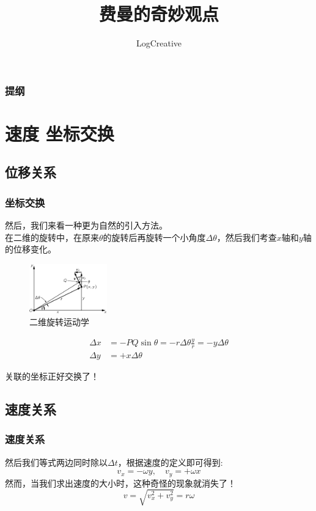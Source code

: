 %

    \title{费曼的奇妙观点}
    \author{LogCreative}

    \maketitle

    \begin{frame}
    \frametitle{提纲}
    \tableofcontents
    \end{frame}

\section{速度 坐标交换}
\subsection[位移关系]{位移关系}
    \begin{frame}
        \frametitle{坐标交换}
        然后，我们来看一种更为自然的引入方法。\\
        在二维的旋转中，在原来$\theta$的旋转后再旋转一个小角度$\Delta\theta$，然后我们考查$x$轴和$y$轴的位移变化。
    \begin{figure}
    \centering
    \includegraphics[width=0.3\textwidth]{pic1.png}
    \caption{二维旋转运动学}
    \end{figure}
    \begin{align}
    \Delta x&=-PQ \sin\theta=-r\Delta\theta \frac{y}{r}=-y\Delta\theta \\
    \Delta y&=+x\Delta\theta
    \end{align}

    关联的坐标正好交换了！
    \end{frame}

\subsection{速度关系}
    \begin{frame}
    \frametitle{速度关系}
    然后我们等式两边同时除以$\Delta t$，根据速度的定义即可得到:
    \begin{equation}
        v_x=-\omega y,\quad  v_y=+\omega x
    \end{equation}
    然而，当我们求出速度的大小时，这种奇怪的现象就消失了！
    \begin{equation}
    v=\sqrt{v_x^2+v_y^2}=r\omega
    \end{equation}
    \end{frame}

